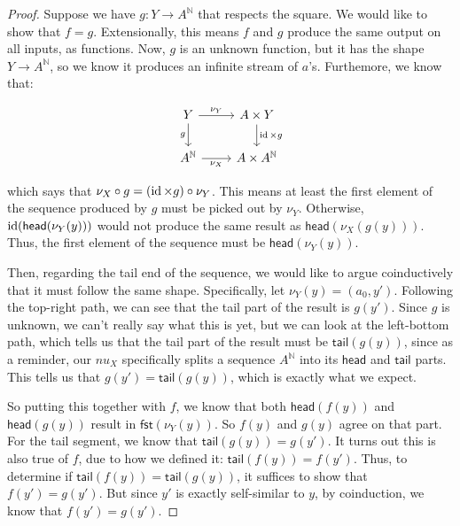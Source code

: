 \begin{proof}
  Suppose we have $g : Y \rightarrow A^\mathbb{N}$ that respects the square.
We would like to show that $f = g$.
Extensionally, this means $f$ and $g$ produce the same output on all inputs, as functions.
Now, $g$ is an unknown function, but it has the shape $Y \rightarrow A^\mathbb{N}$, so we know it produces an infinite stream of $a$'s.
Furthemore, we know that:

    \[\begin{tikzcd}
        Y & {A \times Y} \\
        {A^\mathbb{N}} & {A \times A^\mathbb{N}}
        \arrow["{\nu_Y}", from=1-1, to=1-2]
        \arrow["g"', from=1-1, to=2-1]
        \arrow["{\id \times g}", from=1-2, to=2-2]
        \arrow["{\nu_X}"', from=2-1, to=2-2]
    \end{tikzcd}\]

which says that $\nu_X \circ g = (\operatorname{id} \times g) \circ \nu_Y$.
This means at least the first element of the sequence produced by $g$ must be picked out by $\nu_Y$.
Otherwise, $\operatorname{id}(\mathsf{head}(\nu_Y (y)))$ would not produce the same result as $\mathsf{head}(\nu_X (g(y)))$.
Thus, the first element of the sequence must be $\mathsf{head}(\nu_Y (y))$.

Then, regarding the tail end of the sequence, we would like to argue coinductively that it must follow the same shape.
Specifically, let $\nu_Y (y) = (a_0, y')$.
Following the top-right path, we can see that the tail part of the result is $g(y')$.
Since $g$ is unknown, we can't really say what this is yet, but we can look at the left-bottom path, which tells us that the tail part of the result must be $\mathsf{tail}(g(y))$, since as a reminder, our $nu_X$ specifically splits a sequence $A^\mathbb{N}$ into its $\mathsf{head}$ and $\mathsf{tail}$ parts.
This tells us that $g(y') = \mathsf{tail}(g(y))$, which is exactly what we expect.

So putting this together with $f$, we know that both $\mathsf{head}(f(y))$ and $\mathsf{head}(g(y))$ result in $\mathsf{fst}(\nu_Y (y))$.
So $f(y)$ and $g(y)$ agree on that part.
For the tail segment, we know that $\mathsf{tail}(g(y)) = g(y')$.
It turns out this is also true of $f$, due to how we defined it: $\mathsf{tail}(f(y)) = f(y')$.
Thus, to determine if $\mathsf{tail}(f(y)) = \mathsf{tail}(g(y))$, it suffices to show that $f(y') = g(y')$.
But since $y'$ is exactly self-similar to $y$, by coinduction, we know that $f(y') = g(y')$.
\end{proof}


